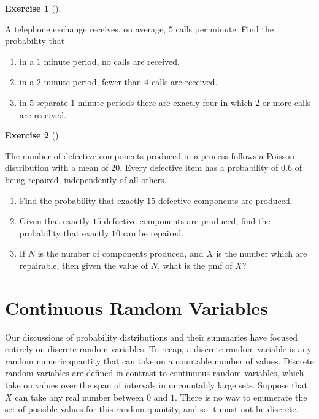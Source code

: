 \documentclass[
  letterpaper,
  DIV=11,
  numbers=noendperiod]{scrreprt}
\providecommand{\tightlist}{%
  \setlength{\itemsep}{0pt}\setlength{\parskip}{0pt}}\usepackage{longtable,booktabs,array}
\theoremstyle{definition}
\newtheorem{exercise}{Exercise}[chapter]
\theoremstyle{definition}
\theoremstyle{definition}
\theoremstyle{remark}
\begin{document}
\begin{exercise}[]\protect\hypertarget{exr-8.19}{}\label{exr-8.19}

A telephone exchange receives, on average, \(5\) calls per minute. Find
the probability that

\begin{enumerate}
\def\labelenumi{\alph{enumi}.}
\tightlist
\item
  in a \(1\) minute period, no calls are received.
\item
  in a \(2\) minute period, fewer than \(4\) calls are received.
\item
  in \(5\) separate \(1\) minute periods there are exactly four in which
  \(2\) or more calls are received.
\end{enumerate}

\end{exercise}

\begin{exercise}[]\protect\hypertarget{exr-8.20}{}\label{exr-8.20}

The number of defective components produced in a process follows a
Poisson distribution with a mean of \(20\). Every defective item has a
probability of \(0.6\) of being repaired, independently of all others.

\begin{enumerate}
\def\labelenumi{\alph{enumi}.}
\tightlist
\item
  Find the probability that exactly \(15\) defective components are
  produced.
\item
  Given that exactly \(15\) defective components are produced, find the
  probability that exactly \(10\) can be repaired.
\item
  If \(N\) is the number of components produced, and \(X\) is the number
  which are repairable, then given the value of \(N\), what is the pmf
  of \(X\)?
\end{enumerate}

\end{exercise}

\chapter{Continuous Random Variables}\label{sec-continuous-rv}

Our discussions of probability distributions and their summaries have
focused entirely on discrete random variables. To recap, a discrete
random variable is any random numeric quantity that can take on a
countable number of values. Discrete random variables are defined in
contrast to continuous random variables, which take on values over the
span of intervals in uncountably large sets. Suppose that \(X\) can take
any real number between \(0\) and \(1\). There is no way to enumerate
the set of possible values for this random quantity, and so it must not
be discrete.
\end{document}
